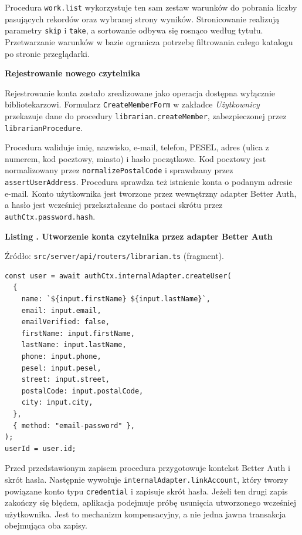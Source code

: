 \documentclass[11pt, a4paper]{article}
\begin{document}
Procedura \texttt{work.list} wykorzystuje ten sam zestaw warunków do pobrania liczby pasujących rekordów oraz wybranej strony wyników. Stronicowanie realizują parametry \texttt{skip} i \texttt{take}, a sortowanie odbywa się rosnąco według tytułu. Przetwarzanie warunków w bazie ogranicza potrzebę filtrowania całego katalogu po stronie przeglądarki.

\noindent\textbf{Rejestrowanie nowego czytelnika}

Rejestrowanie konta zostało zrealizowane jako operacja dostępna wyłącznie bibliotekarzowi. Formularz \texttt{CreateMemberForm} w zakładce \textit{Użytkownicy} przekazuje dane do procedury \texttt{librarian.createMember}, zabezpieczonej przez \texttt{librarianProcedure}.

Procedura waliduje imię, nazwisko, e-mail, telefon, PESEL, adres (ulica z numerem, kod pocztowy, miasto) i hasło początkowe. Kod pocztowy jest normalizowany przez \texttt{normalizePostalCode} i sprawdzany przez \texttt{assertUserAddress}. Procedura sprawdza też istnienie konta o podanym adresie e-mail. Konto użytkownika jest tworzone przez wewnętrzny adapter Better Auth, a hasło jest wcześniej przekształcane do postaci skrótu przez \texttt{authCtx.password.hash}.

\noindent\textbf{Listing \thebdcode. Utworzenie konta czytelnika przez adapter Better Auth}
\label{lst:member-create}
\par\nopagebreak
{\footnotesize
\noindent Źródło: \texttt{src/server/api/routers/librarian.ts} (fragment).
\par\nopagebreak
\begin{verbatim}
const user = await authCtx.internalAdapter.createUser(
  {
    name: `${input.firstName} ${input.lastName}`,
    email: input.email,
    emailVerified: false,
    firstName: input.firstName,
    lastName: input.lastName,
    phone: input.phone,
    pesel: input.pesel,
    street: input.street,
    postalCode: input.postalCode,
    city: input.city,
  },
  { method: "email-password" },
);
userId = user.id;
\end{verbatim}
}

Przed przedstawionym zapisem procedura przygotowuje kontekst Better Auth i skrót hasła. Następnie wywołuje \texttt{internalAdapter.linkAccount}, który tworzy powiązane konto typu \texttt{credential} i zapisuje skrót hasła. Jeżeli ten drugi zapis zakończy się błędem, aplikacja podejmuje próbę usunięcia utworzonego wcześniej użytkownika. Jest to mechanizm kompensacyjny, a nie jedna jawna transakcja obejmująca oba zapisy.
\end{document}
